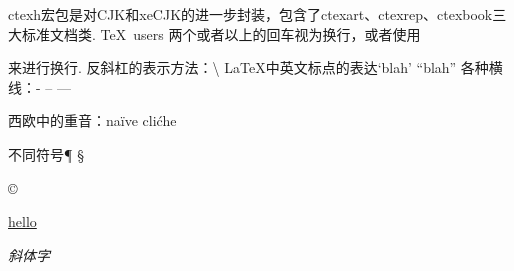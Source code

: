 \documentclass[a4paper]{ctexart}
\begin{document}
	ctexh宏包是对CJK和xeCJK的进一步封装，包含了ctexart、ctexrep、ctexbook三大标准文档类.
	\TeX \ users  %
	两个或者以上的回车视为换行，或者使用\par{}来进行换行.
	反斜杠的表示方法：\textbackslash
	\LaTeX {}中英文标点的表达`blah' ``blah''
	各种横线：- {} -- {} ---\par
	西欧中的重音：na\"ive cli\'che\\
	\par{}不同符号\P{} \S{}\par
	\copyright{} \texttrademark{}\par
	\underline{hello} %
	\par{}\emph{斜体字}\par{}\par
	
\end{document}
